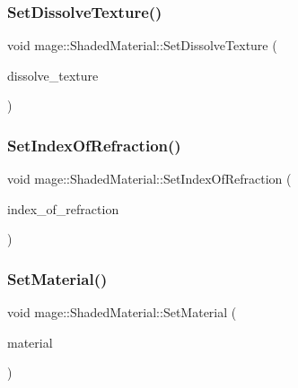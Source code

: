 \hypertarget{structmage_1_1_shaded_material_ab7f2f36caddb8bbdde8753424968c231}{}\label{structmage_1_1_shaded_material_ab7f2f36caddb8bbdde8753424968c231} 
\subsubsection{\texorpdfstring{Set\+Dissolve\+Texture()}{SetDissolveTexture()}}
{\footnotesize\ttfamily void mage\+::\+Shaded\+Material\+::\+Set\+Dissolve\+Texture (\begin{DoxyParamCaption}\item[{\hyperlink{namespacemage_a1e01ae66713838a7a67d30e44c67703e}{Shared\+Ptr}$<$ \hyperlink{classmage_1_1_texture}{Texture} $>$}]{dissolve\+\_\+texture }\end{DoxyParamCaption})}

\hypertarget{structmage_1_1_shaded_material_af287d28549dc682fe4f067a6e30b71a8}{}\label{structmage_1_1_shaded_material_af287d28549dc682fe4f067a6e30b71a8} 
\subsubsection{\texorpdfstring{Set\+Index\+Of\+Refraction()}{SetIndexOfRefraction()}}
{\footnotesize\ttfamily void mage\+::\+Shaded\+Material\+::\+Set\+Index\+Of\+Refraction (\begin{DoxyParamCaption}\item[{float}]{index\+\_\+of\+\_\+refraction }\end{DoxyParamCaption})\hspace{0.3cm}{\ttfamily [noexcept]}}

\hypertarget{structmage_1_1_shaded_material_aca5966123c3267d431539bea500d244b}{}\label{structmage_1_1_shaded_material_aca5966123c3267d431539bea500d244b} 
\subsubsection{\texorpdfstring{Set\+Material()}{SetMaterial()}\hspace{0.1cm}{\footnotesize\ttfamily [1/2]}}
{\footnotesize\ttfamily void mage\+::\+Shaded\+Material\+::\+Set\+Material (\begin{DoxyParamCaption}\item[{const \hyperlink{structmage_1_1_material}{Material} \&}]{material }\end{DoxyParamCaption})}

